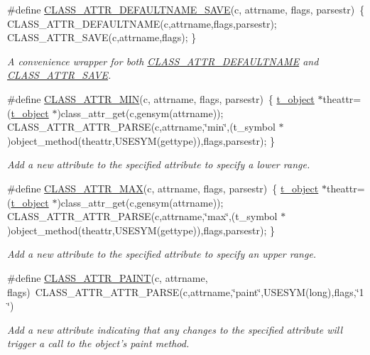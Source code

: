\begin{DoxyCompactItemize}
\#define \hyperlink{group__attr_ga63ecd9c80a1897128996fb906550098c}{CLASS\_\-ATTR\_\-DEFAULTNAME\_\-SAVE}(c, attrname, flags, parsestr)~\{ CLASS\_\-ATTR\_\-DEFAULTNAME(c,attrname,flags,parsestr); CLASS\_\-ATTR\_\-SAVE(c,attrname,flags); \}
\begin{DoxyCompactList}\small\item\em A convenience wrapper for both \hyperlink{group__attr_gaf6ee00a905a84d18172a212667cfa4cb}{CLASS\_\-ATTR\_\-DEFAULTNAME} and \hyperlink{group__attr_gaf56dc31d0defad3cdc1ee60b611acc79}{CLASS\_\-ATTR\_\-SAVE}. \item\end{DoxyCompactList}\item 
\#define \hyperlink{group__attr_gaa4c359315d2cefa59ed8b1200411d85a}{CLASS\_\-ATTR\_\-MIN}(c, attrname, flags, parsestr)~\{ \hyperlink{structt__object}{t\_\-object} $\ast$theattr=(\hyperlink{structt__object}{t\_\-object} $\ast$)class\_\-attr\_\-get(c,gensym(attrname)); CLASS\_\-ATTR\_\-ATTR\_\-PARSE(c,attrname,\char`\"{}min\char`\"{},(t\_\-symbol $\ast$)object\_\-method(theattr,USESYM(gettype)),flags,parsestr); \}
\begin{DoxyCompactList}\small\item\em Add a new attribute to the specified attribute to specify a lower range. \item\end{DoxyCompactList}\item 
\#define \hyperlink{group__attr_ga80157be7023be017f33e5c80b6f845d6}{CLASS\_\-ATTR\_\-MAX}(c, attrname, flags, parsestr)~\{ \hyperlink{structt__object}{t\_\-object} $\ast$theattr=(\hyperlink{structt__object}{t\_\-object} $\ast$)class\_\-attr\_\-get(c,gensym(attrname)); CLASS\_\-ATTR\_\-ATTR\_\-PARSE(c,attrname,\char`\"{}max\char`\"{},(t\_\-symbol $\ast$)object\_\-method(theattr,USESYM(gettype)),flags,parsestr); \}
\begin{DoxyCompactList}\small\item\em Add a new attribute to the specified attribute to specify an upper range. \item\end{DoxyCompactList}\item 
\#define \hyperlink{group__attr_gaee847156d2c156b4c9f73652b6059500}{CLASS\_\-ATTR\_\-PAINT}(c, attrname, flags)~CLASS\_\-ATTR\_\-ATTR\_\-PARSE(c,attrname,\char`\"{}paint\char`\"{},USESYM(long),flags,\char`\"{}1\char`\"{})
\begin{DoxyCompactList}\small\item\em Add a new attribute indicating that any changes to the specified attribute will trigger a call to the object's paint method. \item\end{DoxyCompactList}\item 

\end{DoxyCompactItemize}
